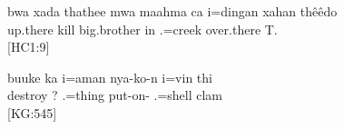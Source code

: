 \ea\label{ex:thathe}
\gll bwa xada thathee mwa maahma ca i=dingan xahan thêêdo\\ 
   up.there kill  big.brother in .=creek over.there T.\\ 
 \glt {} {[HC1:9]}
\z 

\ea\label{ex:pass2}
\gll buuke ka i=aman nya-ko-n i=vin thi\\ 
 destroy ? .=thing put-on- .=shell clam\\ 
\glt {} {[KG:545]}
\z



% 
% 
%
%
%
%
%

